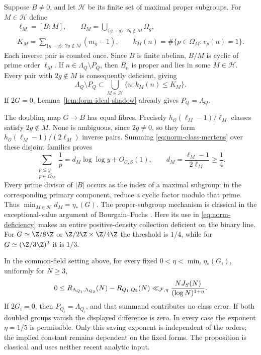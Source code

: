 Suppose $B\ne0$, and let $\mathcal H$ be its finite set of maximal
proper subgroups. For $M\in\mathcal H$ define
\[
 \begin{gathered}
 \ell_M=[B:M],\qquad
 \Omega_M=\bigcup_{\{g,-g\}:\,2g\notin M}\Omega_g,\\
 K_M=\sum_{\{g,-g\}:\,2g\notin M}(m_g-1),\qquad
 k_M(n)=\#\{p\in\Omega_M:v_p(n)=1\}.
 \end{gathered}
\]
Each inverse pair is counted once. Since $B$ is finite abelian,
$B/M$ is cyclic of prime order $\ell_M$. If $n\in\Lambda_Q\setminus P_Q$,
then $B_n$ is proper and lies in some $M\in\mathcal H$. Every pair
with $2g\notin M$ is consequently deficient, giving
\begin{equation}\label{eq:norm-deficiency}
 \Lambda_Q\setminus P_Q\subset
     \bigcup_{M\in\mathcal H}\{n:k_M(n)\le K_M\}.
\end{equation}
If $2G=0$, Lemma~\ref{lem:form-ideal-shadow} already gives $P_Q=\Lambda_Q$.

The doubling map $G\to B$ has equal fibres. Precisely
$h_{\mathcal O}(\ell_M-1)/\ell_M$ classes satisfy $2g\notin M$. None is
ambiguous, since $2g\ne0$, so they form
$h_{\mathcal O}(\ell_M-1)/(2\ell_M)$ inverse pairs. Summing
\eqref{eq:norm-class-mertens} over these disjoint families proves
\begin{equation}\label{eq:norm-maximal-mertens}
 \sum_{\substack{p\le y\\p\in\Omega_M}}\frac1p
     =d_M\log\log y+O_{\mathcal O,S}(1),\qquad
 d_M=\frac{\ell_M-1}{2\ell_M}\ge\frac14.
\end{equation}
Every prime divisor of $|B|$ occurs as the index of a maximal
subgroup: in the corresponding primary component, reduce a cyclic
factor modulo that prime. Thus $\min_{M\in\mathcal H}d_M=\eta_*(G)$.
The proper-subgroup mechanism is classical in the exceptional-value
argument of Bourgain--Fuchs
\cite[Theorem 1, alternative (4.2), and Section 2, part (5)]{bourgainfuchs}.
Here its use in \eqref{eq:norm-deficiency} makes an entire positive-density
collection deficient on the binary line. For $G\simeq\Z/8\Z$ or
$\Z/2\Z\times\Z/4\Z$ the threshold is $1/4$, while for
$G\simeq(\Z/3\Z)^2$ it is $1/3$.

\begin{proposition}\label{prop:norm-class-error}
In the common-field setting above, for every fixed
\(0<\eta<\min_i\eta_*(G_i)\), uniformly for \(N\ge3\),
\begin{equation}\label{eq:form-class-error}\csname ltx@label\endcsname{eq:norm-class-error}
 0\le R_{\Lambda_{Q_1},\Lambda_{Q_2}}(N)-R_{Q_1,Q_2}(N)
 \ll_{\mathcal F,\eta}
              \frac{NJ_S(N)}{(\log N)^{1+\eta}}.
\end{equation}
If \(2G_i=0\), then \(P_{Q_i}=\Lambda_{Q_i}\), and that summand
contributes no class error. If both doubled groups vanish the displayed
difference is zero. In every case the exponent \(\eta=1/5\) is
permissible. Only this saving exponent is independent of the orders;
the implied constant remains dependent on the fixed forms.
The proposition is classical and uses neither recent analytic input.
\end{proposition}

